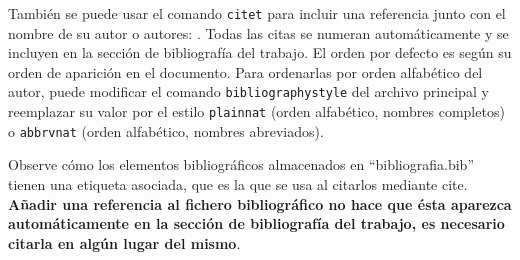 También se puede usar el comando \texttt{citet} para incluir una referencia junto con el nombre de su autor o autores: \textcite{borrego2021}. Todas las citas se numeran automáticamente y se incluyen en la sección de bibliografía del trabajo. El orden por defecto es según su orden de aparición en el documento. Para ordenarlas por orden alfabético del autor, puede modificar el comando \texttt{bibliographystyle} del archivo principal y reemplazar su valor por el estilo \texttt{plainnat} (orden alfabético, nombres completos) o \texttt{abbrvnat} (orden alfabético, nombres abreviados).

Observe cómo los elementos bibliográficos almacenados en ``bibliografia.bib'' tienen una etiqueta asociada, que es la que se usa al citarlos mediante cite. \textbf{Añadir una referencia al fichero bibliográfico no hace que ésta aparezca automáticamente en la sección de bibliografía del trabajo, es necesario citarla en algún lugar del mismo}.






